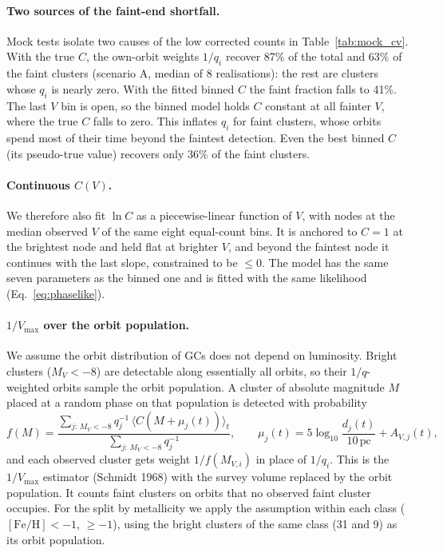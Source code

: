 \documentclass[11pt,a4paper]{article}
\newcommand{\MV}{M_V}
\newcommand{\feh}{[\mathrm{Fe/H}]}
\begin{document}
\paragraph{Two sources of the faint-end shortfall.} Mock tests isolate two causes of the low corrected
counts in Table~\ref{tab:mock_cv}. With the true $C$, the own-orbit weights $1/q_i$ recover 87\% of the
total and 63\% of the faint clusters (scenario A, median of 8 realisations): the rest are clusters
whose $q_i$ is nearly zero. With the fitted binned $C$ the faint fraction falls to 41\%. The last
$V$ bin is open, so the binned model holds $C$ constant at all fainter $V$, where the true $C$ falls to
zero. This inflates $q_i$ for faint clusters, whose orbits spend most of their time beyond the
faintest detection. Even the best binned $C$ (its pseudo-true value) recovers only 36\% of the faint
clusters.

\paragraph{Continuous $C(V)$.} We therefore also fit $\ln C$ as a piecewise-linear function of $V$,
with nodes at the median observed $V$ of the same eight equal-count bins. It is anchored to $C=1$ at
the brightest node and held flat at brighter $V$, and beyond the faintest node it continues with the
last slope, constrained to be $\le 0$. The model has the same seven parameters as the binned one and
is fitted with the same likelihood (Eq.~\ref{eq:phaselike}).

\paragraph{$1/V_{\max}$ over the orbit population.} We assume the orbit distribution of GCs does not
depend on luminosity. Bright clusters ($\MV<-8$) are detectable along essentially all orbits, so their
$1/q$-weighted orbits sample the orbit population. A cluster of absolute magnitude $M$ placed at a
random phase on that population is detected with probability
\begin{equation}
f(M) = \frac{\sum_{j:\,\MV<-8} q_j^{-1}\,\langle C(M+\mu_j(t))\rangle_t}{\sum_{j:\,\MV<-8} q_j^{-1}},
\qquad \mu_j(t) = 5\log_{10}\frac{d_j(t)}{10\,\mathrm{pc}} + A_{V,j}(t),
\end{equation}
and each observed cluster gets weight $1/f(M_{V,i})$ in place of $1/q_i$. This is the
$1/V_{\max}$ estimator (Schmidt 1968) with the survey volume replaced by the orbit population. It
counts faint clusters on orbits that no observed faint cluster occupies. For the split by
metallicity we apply the assumption within each class ($\feh<-1$, $\ge-1$), using the bright
clusters of the same class (31 and 9) as its orbit population.
\end{document}
